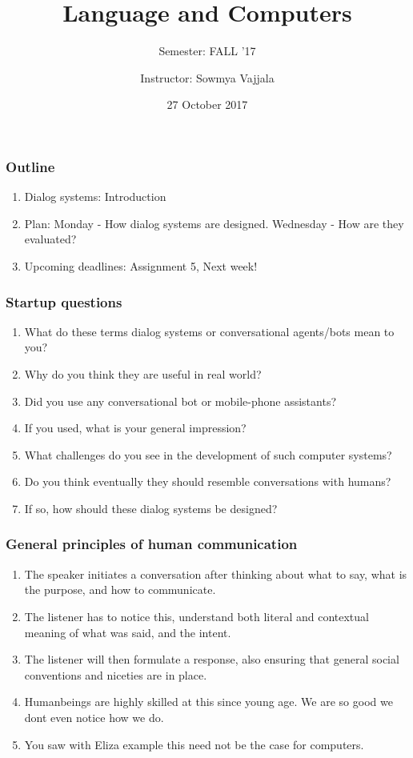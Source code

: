 \documentclass{beamer}
\author[Sowmya Vajjala]{Instructor: Sowmya Vajjala}
\title[LING 120]{Language and Computers}
\subtitle{Semester: FALL '17}
\date{27 October 2017}
\institute{Iowa State University, USA}
\begin{document}
\begin{frame}\titlepage
\end{frame}

\begin{frame}
\frametitle{Outline}
\begin{enumerate}
\item Dialog systems: Introduction
\item Plan: Monday - How dialog systems are designed. Wednesday - How are they evaluated?
\item Upcoming deadlines: Assignment 5, Next week!
\end{enumerate}
\end{frame}

\begin{frame}
\frametitle{Startup questions}
\begin{enumerate}
\item What do these terms dialog systems or conversational agents/bots mean to you? \pause
\item Why do you think they are useful in real world? \pause
\item Did you use any conversational bot or mobile-phone assistants? \pause
\item If you used, what is your general impression? \pause
\item What challenges do you see in the development of such computer systems? \pause
\item Do you think eventually they should resemble conversations with humans? \pause
\item If so, how should these dialog systems be designed? 
\end{enumerate}
\end{frame}

\begin{frame}
\frametitle{General principles of human communication}
\begin{enumerate}
\item The speaker initiates a conversation after thinking about what to say, what is the purpose, and how to communicate. 
\item The listener has to notice this, understand both literal and contextual meaning of what was said, and the intent.
\item The listener will then formulate a response, also ensuring that general social conventions and niceties are in place. \pause
\item Humanbeings are highly skilled at this since young age. We are so good we dont even notice how we do.
\item You saw with Eliza example this need not be the case for computers. \pause
\end{enumerate}
\end{frame}
\end{document}

